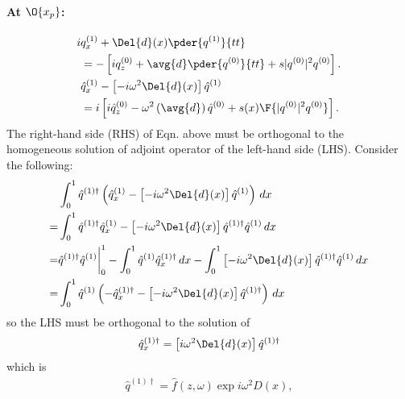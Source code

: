 \paragraph{At $\O{x_p}$:}
\begin{equation}
\begin{split}
i &q^{(1)}_x + \Del{d}(x) \pder{q^{(1)}}{tt}\\
&= -\left[i q^{(0)}_z + \avg{d} \pder{q^{(0)}}{tt} +s |q^{(0)}|^2 q^{(0)}\right] .\\
&\hat{q}^{(1)}_x - \left[-i \omega^2  \Del{d}(x) \right] \hat{q}^{(1)} \\
&= i\left[i \hat{q}^{(0)}_z - \omega^2 \left(\avg{d}\right) \hat{q}^{(0)} + s(x)\F{|q^{(0)}|^2 q^{(0)}} \right].\\
\end{split}
\end{equation}
The right-hand side (RHS) of Eqn. above must be orthogonal to the homogeneous solution of adjoint operator of the left-hand side (LHS). 
Consider the following:
\begin{equation}\label{equ:CGLE+DM_O2_1}
\begin{split}
&\int_{0}^{1} \hat{q}^{(1)\dagger} \left(\hat{q}^{(1)}_x - \left[-i \omega^2  \Del{d}(x)\right] \hat{q}^{(1)}\right) \, dx \\
= & \int_{0}^{1} \hat{q}^{(1)\dagger} \hat{q}^{(1)}_x - \left[-i \omega^2  \Del{d}(x)\right]  \hat{q}^{(1)\dagger}  \hat{q}^{(1)} \, dx \\
= & \hat{q}^{(1)\dagger} \hat{q}^{(1)} \bigg|_{0}^{1}  - \int_{0}^{1}  \hat{q}^{(1)} \hat{q}^{(1)\dagger}_x \, dx - \int_{0}^{1}\left[-i \omega^2  \Del{d}(x) \right]  \hat{q}^{(1)\dagger}  \hat{q}^{(1)} \, dx \\
= & \int_{0}^{1}\hat{q}^{(1)} \left( -\hat{q}^{(1)\dagger}_x - \left[-i \omega^2  \Del{d}(x) \right]  \hat{q}^{(1)\dagger} \right) \, dx \\
\end{split}
\end{equation}
so the LHS must be orthogonal to the solution of
\begin{equation}
\begin{split}
\hat{q}^{(1)\dagger}_x = \left[i \omega^2  \Del{d}(x)\right]  \hat{q}^{(1)\dagger}\\
\end{split}
\end{equation}
which is 
\begin{equation}
\begin{split}
\hat{q}^{(1)\dagger} =  \hat{f}(z,\omega) \exp{i \omega^2 D(x)}, \\
\end{split}
\end{equation}
